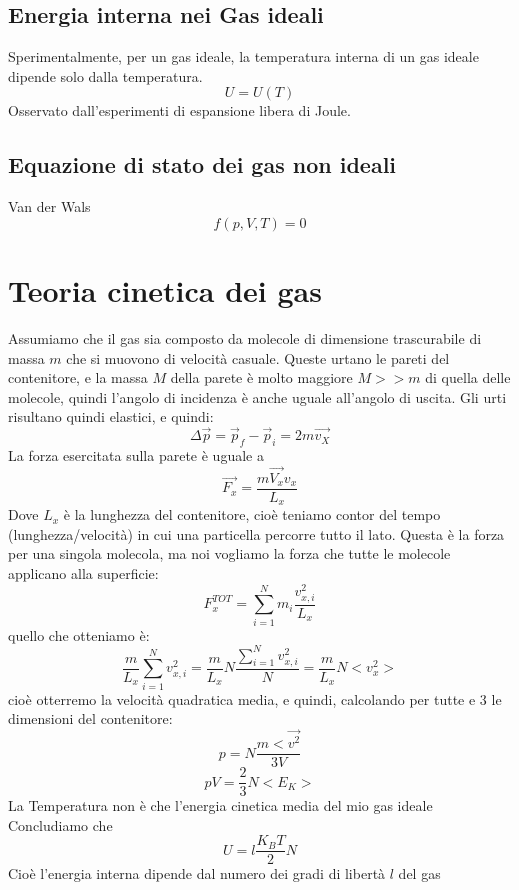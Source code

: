 \documentclass[a4paper]{report}
\begin{document}
  \subsection{Energia interna nei Gas ideali}
  Sperimentalmente, per  un gas ideale, la temperatura interna di un gas ideale dipende solo dalla temperatura.
  $$ U = U(T) $$
  Osservato dall'esperimenti di espansione libera di Joule.
  \subsection{Equazione di stato dei gas non ideali}
  Van der Wals
  $$ f(p,V,T) = 0 $$

  \section{Teoria cinetica dei gas}
  Assumiamo che il gas sia composto da molecole di dimensione trascurabile di massa $m$ che si muovono di velocità casuale. Queste urtano le pareti del contenitore, e la massa $M$ della parete è molto maggiore $M>>m$ di quella delle molecole, quindi l'angolo di incidenza è anche uguale all'angolo di uscita. Gli urti risultano quindi elastici, e quindi:
  $$ \Delta \vec{p} = \vec{p}_f - \vec{p}_i = 2 m\vec{v_X}$$
  La forza esercitata sulla parete è uguale a
  $$ \vec{F_x} = \frac{m \vec{V_x} v_x}{L_x}$$
  Dove $L_x$ è la lunghezza del contenitore, cioè teniamo contor del tempo (lunghezza/velocità) in cui una particella percorre tutto il lato. Questa è la forza per una singola molecola, ma noi vogliamo la forza che tutte le molecole applicano alla superficie:
  $$ F_x^{TOT} = \sum_{i=1}^N m_i \frac{v_{x,i}^2}{L_x}$$
  quello che otteniamo è:
  $$\frac{m}{L_x} \sum_{i=1}^N v_{x,i}^2 = \frac{m}{L_x} N \frac{\sum_{i=1}^N v_{x,i}^2}{N} = \frac{m}{L_x}N <v_x^2>$$
  cioè otterremo la velocità quadratica media, e quindi, calcolando per tutte e 3 le dimensioni del contenitore:
  $$p = N \frac{m <\vec{v^2}}{3V}$$
  $$pV = \frac{2}{3} N <E_K>$$
  La Temperatura non è che l'energia cinetica media del mio gas ideale
  Concludiamo che
  $$ U = l \frac{K_B T}{2} N$$
  Cioè l'energia interna dipende dal numero dei gradi di libertà $l$ del gas
\end{document}
